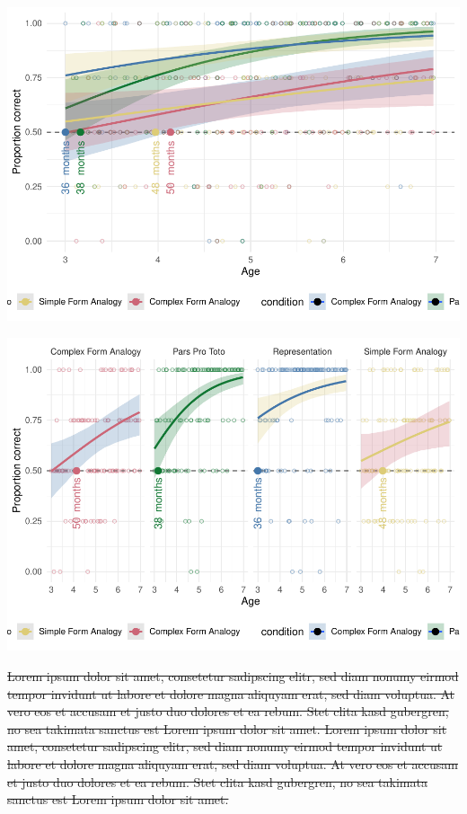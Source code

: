 \documentclass[
  man]{apa6}
\begin{document}
\includegraphics{symlit_rep_manuscript_files/figure-latex/S1_bayes_plot_no_facets-1.pdf}

\includegraphics{symlit_rep_manuscript_files/figure-latex/S1_bayes_plot-1.pdf}

\st{Lorem ipsum dolor sit amet, consetetur sadipscing elitr, sed diam nonumy eirmod tempor invidunt ut labore et dolore magna aliquyam erat, sed diam voluptua. At vero eos et accusam et justo duo dolores et ea rebum. Stet clita kasd gubergren, no sea takimata sanctus est Lorem ipsum dolor sit amet. Lorem ipsum dolor sit amet, consetetur sadipscing elitr, sed diam nonumy eirmod tempor invidunt ut labore et dolore magna aliquyam erat, sed diam voluptua. At vero eos et accusam et justo duo dolores et ea rebum. Stet clita kasd gubergren, no sea takimata sanctus est Lorem ipsum dolor sit amet.}
\end{document}
